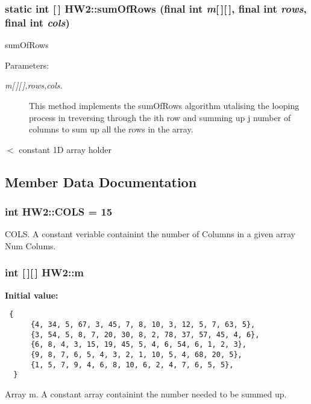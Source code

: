 \subsubsection{\setlength{\rightskip}{0pt plus 5cm}static int [$\,$] HW2::sum\-Of\-Rows (final int {\em m}[$\,$][$\,$], final int {\em rows}, final int {\em cols})\hspace{0.3cm}{\tt  [inline, static]}}\label{class_h_w2_c004095adb58da869da20a3db69accfa}


sum\-Of\-Rows 

\begin{Desc}
\item[Parameters:]
\begin{description}
\item[{\em m\mbox{[}$\,$\mbox{]}\mbox{[}$\,$\mbox{]},rows,cols.}]This method implements the sum\-Of\-Rows algorithm utalising the looping process in treversing through the ith row and summing up j number of columns to sum up all the rows in the array.\end{description}
\end{Desc}
$<$ constant 1D array holder 

\subsection{Member Data Documentation}
\subsubsection{\setlength{\rightskip}{0pt plus 5cm}int {\bf HW2::COLS} = 15\hspace{0.3cm}{\tt  [static, package]}}\label{class_h_w2_2b1adc9059c79fd8ebc82bef3720237a}


COLS. A constant veriable containint the number of Columns in a given array Num Colums. 

\subsubsection{\setlength{\rightskip}{0pt plus 5cm}int [$\,$][$\,$] {\bf HW2::m}\hspace{0.3cm}{\tt  [static, package]}}\label{class_h_w2_52e31bdd24f172cf7f9959a80c155ce1}


{\bf Initial value:}

\footnotesize\begin{verbatim} {
      {4, 34, 5, 67, 3, 45, 7, 8, 10, 3, 12, 5, 7, 63, 5},
      {3, 54, 5, 8, 7, 20, 30, 8, 2, 78, 37, 57, 45, 4, 6},
      {6, 8, 4, 3, 15, 19, 45, 5, 4, 6, 54, 6, 1, 2, 3},
      {9, 8, 7, 6, 5, 4, 3, 2, 1, 10, 5, 4, 68, 20, 5},
      {1, 5, 7, 9, 4, 6, 8, 10, 6, 2, 4, 7, 6, 5, 5},
  }
\end{verbatim}\normalsize 
Array m. A constant array containint the number needed to be summed up. 

